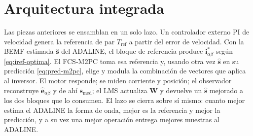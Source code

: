 \documentclass[../../../Tesis_JALS_Maestria.tex]{subfiles}
\begin{document}
\section{Arquitectura integrada}
\label{sec:arquitectura}

Las piezas anteriores se ensamblan en un solo lazo. Un controlador externo PI de velocidad genera la referencia de par $T_\mathrm{ref}$ a partir del error de velocidad. Con la BEMF estimada $\hat{\mathbf{s}}$ del ADALINE, el bloque de referencia produce $\mathbf{i}_{\alpha\beta}^*$ según \eqref{eq:iref-optima}. El FCS-M2PC toma esa referencia y, usando otra vez $\hat{\mathbf{s}}$ en su predicción \eqref{eq:pred-m2pc}, elige y modula la combinación de vectores que aplica al inversor. El motor responde; se miden corriente y posición; el observador reconstruye $\hat{\mathbf{e}}_{\alpha\beta}$ y de ahí $\mathbf{s}_\mathrm{med}$; el LMS actualiza $\mathbf{W}$ y devuelve un $\hat{\mathbf{s}}$ mejorado a los dos bloques que lo consumen. El lazo se cierra sobre sí mismo: cuanto mejor estima el ADALINE la forma de onda, mejor es la referencia y mejor la predicción, y a su vez una mejor operación entrega mejores muestras al ADALINE.
\end{document}
